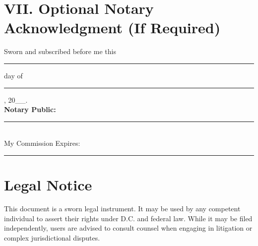 \documentclass[12pt,letterpaper]{article}
\begin{document}
\vspace{2em}

\section*{VII. Optional Notary Acknowledgment (If Required)}

Sworn and subscribed before me this \rule{3cm}{0.4pt} day of \rule{5cm}{0.4pt}, 20\_\_. \\
\textbf{Notary Public:} \rule{7cm}{0.4pt} \\
My Commission Expires: \rule{5cm}{0.4pt}

\vspace{2em}

\section*{Legal Notice}

This document is a sworn legal instrument. It may be used by any competent individual to assert their rights under D.C. and federal law. While it may be filed independently, users are advised to consult counsel when engaging in litigation or complex jurisdictional disputes.
\end{document}
